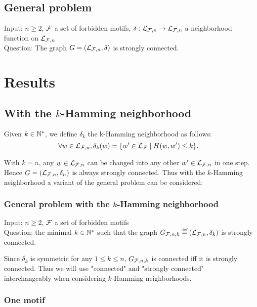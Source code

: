 \documentclass{article}
\begin{document}
\subsection*{General problem}

Input: $n \geq 2$, $\mathcal{F}$ a set of forbidden motifs, $\delta: \mathcal{L}_{\mathcal{F}, n} \rightarrow \mathcal{L}_{\mathcal{F}, n}$ a neighborhood function on $\mathcal{L}_{\mathcal{F}, n}$ \\
Question: The graph $G = (\mathcal{L}_{\mathcal{F}, n}, \delta)$ is strongly connected.

\section{Results}

\subsection{With the $k$-Hamming neighborhood}
\begin{definition}
	Given $k \in \mathbb{N}^*$, we define $\delta_k$ the k-Hamming neighborhood as follows:
	$$\forall w \in \mathcal{L}_{\mathcal{F}, n},  \delta_k(w) = \{w'\in \mathcal{L}_{\mathcal{F}} \mid H(w,w')\le k\}. $$
\end{definition}

With $k = n$, any $w \in \mathcal{L}_{\mathcal{F}, n}$ can be changed into any other $w' \in \mathcal{L}_{\mathcal{F}, n}$ in one step. Hence $G = (\mathcal{L}_{\mathcal{F}, n}, \delta_n)$ is always strongly connected. Thus with the $k$-Hamming neighborhood a variant of the general problem can be considered:

\subsubsection*{General problem with the $k$-Hamming neighborhood}

Input: $n \geq 2$, $\mathcal{F}$ a set of forbidden motifs \\
Question: the minimal $k \in \mathbb{N}^*$ such that the graph $G_{\Forb, n, k} \EqDef (\LFn, \delta_k)$ is strongly connected.

\begin{remark}
	Since $\delta_k$ is symmetric for any $1 \leq k \leq n$, $G_{\mathcal{F}, n, k}$ is connected iff it is strongly connected. Thus we will use "connected" and "strongly connected" interchangeably when considering $k$-Hamming neighborhoods.
\end{remark}

\subsubsection{One motif}
\end{document}
